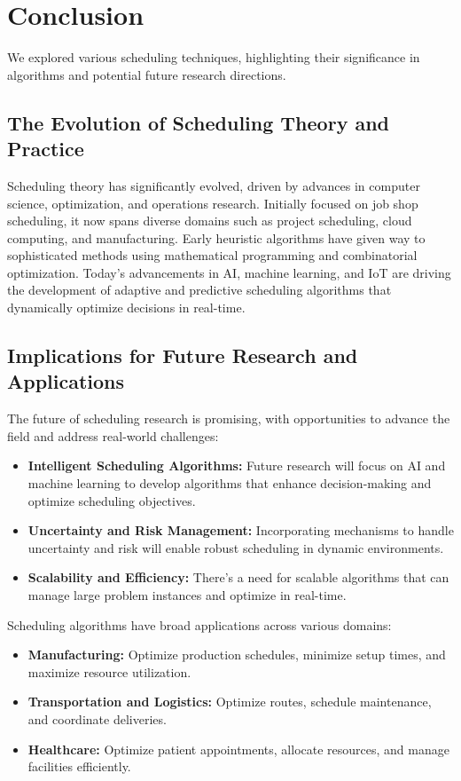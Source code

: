 \documentclass[12pt]{book} %
\begin{document}
\section{Conclusion}
We explored various scheduling techniques, highlighting their significance in algorithms and potential future research directions.

\subsection{The Evolution of Scheduling Theory and Practice}
Scheduling theory has significantly evolved, driven by advances in computer science, optimization, and operations research. Initially focused on job shop scheduling, it now spans diverse domains such as project scheduling, cloud computing, and manufacturing. Early heuristic algorithms have given way to sophisticated methods using mathematical programming and combinatorial optimization. Today's advancements in AI, machine learning, and IoT are driving the development of adaptive and predictive scheduling algorithms that dynamically optimize decisions in real-time.

\subsection{Implications for Future Research and Applications}
The future of scheduling research is promising, with opportunities to advance the field and address real-world challenges:

\begin{itemize}
\item \textbf{Intelligent Scheduling Algorithms:} Future research will focus on AI and machine learning to develop algorithms that enhance decision-making and optimize scheduling objectives.
\item \textbf{Uncertainty and Risk Management:} Incorporating mechanisms to handle uncertainty and risk will enable robust scheduling in dynamic environments.
\item \textbf{Scalability and Efficiency:} There's a need for scalable algorithms that can manage large problem instances and optimize in real-time.
\end{itemize}

Scheduling algorithms have broad applications across various domains:

\begin{itemize}
\item \textbf{Manufacturing:} Optimize production schedules, minimize setup times, and maximize resource utilization.
\item \textbf{Transportation and Logistics:} Optimize routes, schedule maintenance, and coordinate deliveries.
\item \textbf{Healthcare:} Optimize patient appointments, allocate resources, and manage facilities efficiently.
\end{itemize}
\end{document}
